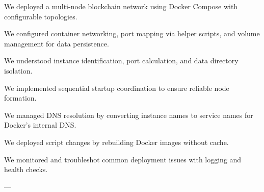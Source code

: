 \begin{chaptersummary}
\item We deployed a multi-node blockchain network using Docker Compose with configurable topologies.
\item We configured container networking, port mapping via helper scripts, and volume management for data persistence.
\item We understood instance identification, port calculation, and data directory isolation.
\item We implemented sequential startup coordination to ensure reliable node formation.
\item We managed DNS resolution by converting instance names to service names for Docker's internal DNS.
\item We deployed script changes by rebuilding Docker images without cache.
\item We monitored and troubleshot common deployment issues with logging and health checks.
\end{chaptersummary}

---
